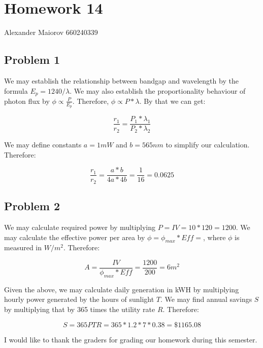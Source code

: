 \documentclass[12pt]{report}
\begin{document}
\chapter*{Homework 14}
Alexander Maiorov 660240339
\section*{Problem 1} 
We may establish the relationship between bandgap and wavelength by the formula $E_{p} = 1240/\lambda$. We may also establish the proportionality behaviour of photon flux by $\phi \propto \frac{P}{E_{p}}$. Therefore, $\phi \propto P * \lambda$. By that we can get:

$$\frac{r_1}{r_2} = \frac{P_1 * \lambda_1}{P_2 * \lambda_2}$$

We may define constants $a = 1mW$ and $b = 565nm$ to simplify our calculation. Therefore:

$$\frac{r_1}{r_2} = \frac{a * b}{4a * 4b} = \frac{1}{16} = 0.0625$$

\newpage
\section*{Problem 2}

We may calculate required power by multiplying $P = IV = 10 * 120 = 1200$. We may calculate the effective power per area by $\phi = \phi_{max} * Eff = $, where $\phi$ is measured in $W/m^2$. Therefore:

$$ A = \frac{IV}{\phi_{max} * Eff} = \frac{1200}{200} = 6m^2$$

Given the above, we may calculate daily generation in kWH by multiplying hourly power generated by the hours of sunlight $T$. We may find annual savings $S$ by multiplying that by 365 times the utility rate $R$. Therefore:

$$S = 365PTR = 365 * 1.2 * 7 * 0.38 = \$1165.08$$

I would like to thank the graders for grading our homework during this semester. 
\end{document}
